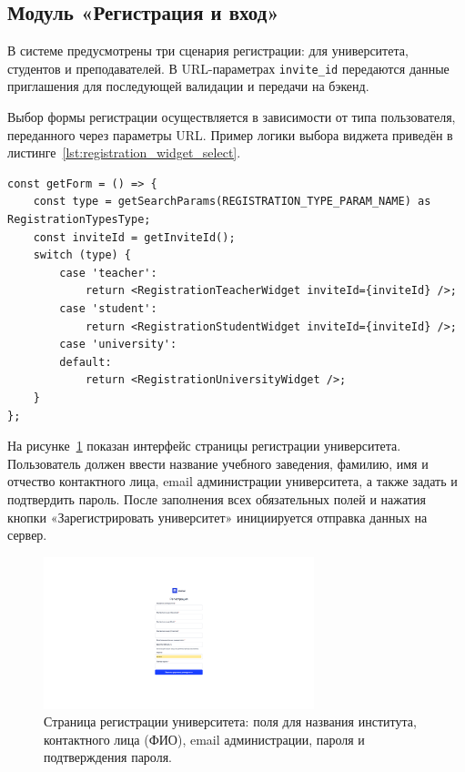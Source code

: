 \subsection{Модуль «Регистрация и вход»}

В системе предусмотрены три сценария регистрации: для университета, студентов и преподавателей. В URL-параметрах \texttt{invite\_id} передаются данные приглашения для последующей валидации и передачи на бэкенд.

Выбор формы регистрации осуществляется в зависимости от типа пользователя, переданного через параметры URL. Пример логики выбора виджета приведён в листинге~\ref{lst:registration_widget_select}.

\begin{lstlisting}[caption={Выбор виджета регистрации по типу}, label={lst:registration_widget_select}]
const getForm = () => {
    const type = getSearchParams(REGISTRATION_TYPE_PARAM_NAME) as RegistrationTypesType;
    const inviteId = getInviteId();
    switch (type) {
        case 'teacher':
            return <RegistrationTeacherWidget inviteId={inviteId} />;
        case 'student':
            return <RegistrationStudentWidget inviteId={inviteId} />;
        case 'university':
        default:
            return <RegistrationUniversityWidget />;
    }
};
\end{lstlisting}
На рисунке~\ref{fig:registration_university} показан интерфейс страницы регистрации университета. Пользователь должен ввести название учебного заведения, фамилию, имя и отчество контактного лица, email администрации университета, а также задать и подтвердить пароль. После заполнения всех обязательных полей и нажатия кнопки «Зарегистрировать университет» инициируется отправка данных на сервер.

\begin{figure}[H]
    \centering
    \includegraphics[width=0.7\textwidth]{static/presintation/RegPage.png} %
    \caption{Страница регистрации университета: поля для названия института, контактного лица (ФИО), email администрации, пароля и подтверждения пароля.}
    \label{fig:registration_university}
\end{figure}

